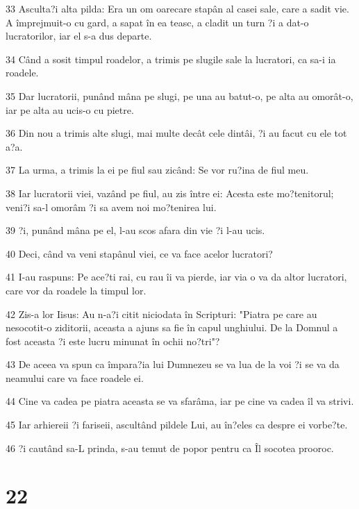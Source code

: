 \par 33 Asculta?i alta pilda: Era un om oarecare stapân al casei sale, care a sadit vie. A împrejmuit-o cu gard, a sapat în ea teasc, a cladit un turn ?i a dat-o lucratorilor, iar el s-a dus departe.
\par 34 Când a sosit timpul roadelor, a trimis pe slugile sale la lucratori, ca sa-i ia roadele.
\par 35 Dar lucratorii, punând mâna pe slugi, pe una au batut-o, pe alta au omorât-o, iar pe alta au ucis-o cu pietre.
\par 36 Din nou a trimis alte slugi, mai multe decât cele dintâi, ?i au facut cu ele tot a?a.
\par 37 La urma, a trimis la ei pe fiul sau zicând: Se vor ru?ina de fiul meu.
\par 38 Iar lucratorii viei, vazând pe fiul, au zis între ei: Acesta este mo?tenitorul; veni?i sa-l omorâm ?i sa avem noi mo?tenirea lui.
\par 39 ?i, punând mâna pe el, l-au scos afara din vie ?i l-au ucis.
\par 40 Deci, când va veni stapânul viei, ce va face acelor lucratori?
\par 41 I-au raspuns: Pe ace?ti rai, cu rau îi va pierde, iar via o va da altor lucratori, care vor da roadele la timpul lor.
\par 42 Zis-a lor Iisus: Au n-a?i citit niciodata în Scripturi: "Piatra pe care au nesocotit-o ziditorii, aceasta a ajuns sa fie în capul unghiului. De la Domnul a fost aceasta ?i este lucru minunat în ochii no?tri"?
\par 43 De aceea va spun ca împara?ia lui Dumnezeu se va lua de la voi ?i se va da neamului care va face roadele ei.
\par 44 Cine va cadea pe piatra aceasta se va sfarâma, iar pe cine va cadea îl va strivi.
\par 45 Iar arhiereii ?i fariseii, ascultând pildele Lui, au în?eles ca despre ei vorbe?te.
\par 46 ?i cautând sa-L prinda, s-au temut de popor pentru ca Îl socotea prooroc.

\chapter{22}

